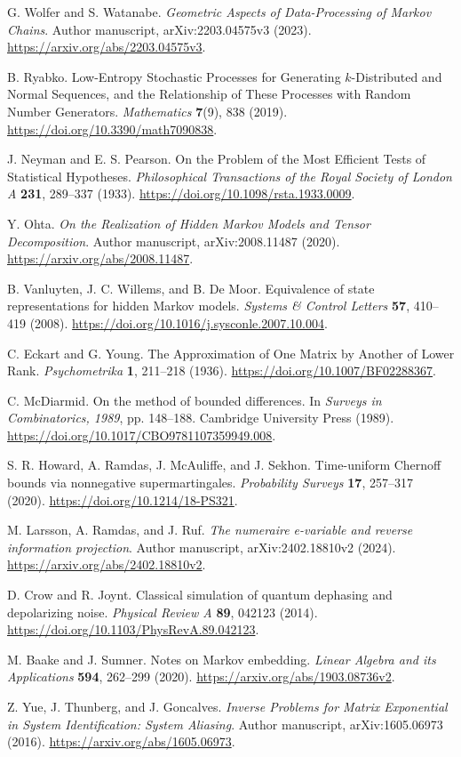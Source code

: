 G. Wolfer and S. Watanabe.
\emph{Geometric Aspects of Data-Processing of Markov Chains}.
Author manuscript, arXiv:2203.04575v3 (2023).
\url{https://arxiv.org/abs/2203.04575v3}.

B. Ryabko.
Low-Entropy Stochastic Processes for Generating \(k\)-Distributed and Normal
Sequences, and the Relationship of These Processes with Random Number Generators.
\emph{Mathematics} \textbf{7}(9), 838 (2019).
\url{https://doi.org/10.3390/math7090838}.

J. Neyman and E. S. Pearson.
On the Problem of the Most Efficient Tests of Statistical Hypotheses.
\emph{Philosophical Transactions of the Royal Society of London A}
\textbf{231}, 289--337 (1933).
\url{https://doi.org/10.1098/rsta.1933.0009}.

Y. Ohta.
\emph{On the Realization of Hidden Markov Models and Tensor Decomposition}.
Author manuscript, arXiv:2008.11487 (2020).
\url{https://arxiv.org/abs/2008.11487}.

B. Vanluyten, J. C. Willems, and B. De Moor.
Equivalence of state representations for hidden Markov models.
\emph{Systems \& Control Letters} \textbf{57}, 410--419 (2008).
\url{https://doi.org/10.1016/j.sysconle.2007.10.004}.

C. Eckart and G. Young.
The Approximation of One Matrix by Another of Lower Rank.
\emph{Psychometrika} \textbf{1}, 211--218 (1936).
\url{https://doi.org/10.1007/BF02288367}.

C. McDiarmid.
On the method of bounded differences.
In \emph{Surveys in Combinatorics, 1989}, pp. 148--188.
Cambridge University Press (1989).
\url{https://doi.org/10.1017/CBO9781107359949.008}.

S. R. Howard, A. Ramdas, J. McAuliffe, and J. Sekhon.
Time-uniform Chernoff bounds via nonnegative supermartingales.
\emph{Probability Surveys} \textbf{17}, 257--317 (2020).
\url{https://doi.org/10.1214/18-PS321}.

M. Larsson, A. Ramdas, and J. Ruf.
\emph{The numeraire e-variable and reverse information projection}.
Author manuscript, arXiv:2402.18810v2 (2024).
\url{https://arxiv.org/abs/2402.18810v2}.

D. Crow and R. Joynt.
Classical simulation of quantum dephasing and depolarizing noise.
\emph{Physical Review A} \textbf{89}, 042123 (2014).
\url{https://doi.org/10.1103/PhysRevA.89.042123}.

M. Baake and J. Sumner.
Notes on Markov embedding.
\emph{Linear Algebra and its Applications} \textbf{594}, 262--299 (2020).
\url{https://arxiv.org/abs/1903.08736v2}.

Z. Yue, J. Thunberg, and J. Goncalves.
\emph{Inverse Problems for Matrix Exponential in System Identification:
System Aliasing}.
Author manuscript, arXiv:1605.06973 (2016).
\url{https://arxiv.org/abs/1605.06973}.
